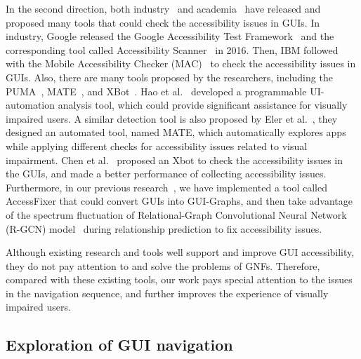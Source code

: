In the second direction, both industry~\cite{AccessibilityScanner, MAC, AAAT} and academia~\cite{Liu2020OwlES, Alotaibi2023ScaleFixAA, Alotaibi2021AutomatedRO, Alshayban2022AccessiTextAD} have released and proposed many tools that could check the accessibility issues in GUIs.
In industry, Google released the Google Accessibility Test Framework~\cite{AccessibilityTF} and the corresponding tool called Accessibility Scanner~\cite{AccessibilityScanner} in 2016.
Then, IBM followed with the Mobile Accessibility Checker (MAC)~\cite{MobileAccessibilityChecker} to check the accessibility issues in GUIs.
Also, there are many tools proposed by the researchers, including the PUMA~\cite{Hao2014PUMAPU}, MATE~\cite{Eler2018AutomatedAT}, and XBot~\cite{Chen2021AccessibleON}.
Hao et al.~\cite{Hao2014PUMAPU} developed a programmable UI-automation analysis tool, which could provide significant assistance for visually impaired users.
A similar detection tool is also proposed by Eler et al.~\cite{Eler2018AutomatedAT}, they designed an automated tool, named MATE, which automatically explores apps while applying different checks for accessibility issues related to visual impairment.
Chen et al.~\cite{Chen2021AccessibleON} proposed an Xbot to check the accessibility issues in the GUIs, and made a better performance of collecting accessibility issues.
Furthermore, in our previous research~\cite{10338828}, we have implemented a tool called AccessFixer that could convert GUIs into GUI-Graphs, and then take advantage of the spectrum fluctuation of Relational-Graph Convolutional Neural Network (R-GCN) model~\cite{Schlichtkrull2018ModelingRD} during relationship prediction to fix accessibility issues.

Although existing research and tools well support and improve GUI accessibility, they do not pay attention to and solve the problems of GNFs.
Therefore, compared with these existing tools, our work pays special attention to the issues in the navigation sequence, and further improves the experience of visually impaired users.

\subsection{Exploration of GUI navigation}

